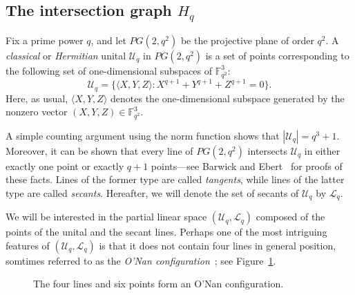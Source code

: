 \documentclass[A4paper,reqno,oneside,12pt]{amsart}
\theoremstyle{plain}
\theoremstyle{definition}
\newcommand{\scL}{\mathscr{L}}
\newcommand{\scU}{\mathscr{U}}
\newcommand{\F}{\mathbb{F}}
\begin{document}
\subsection{The intersection graph $H_q$}
Fix a prime power $q$, and let $PG(2,q^2)$ be the projective plane of order $q^2$.
A {\it classical} or {\it Hermitian} unital $\scU_q$ in $PG(2,q^2)$ is a set of points corresponding to the following set of one-dimensional subspaces of $\F_{q^2}^3$:
\begin{equation*}
    \scU_q = \{ \langle X, Y, Z \rangle: X^{q+1} + Y^{q+1} + Z^{q+1} = 0 \}.
\end{equation*}
Here, as usual, $\langle X, Y, Z \rangle$ denotes the one-dimensional subspace generated by the nonzero vector $(X,Y,Z) \in \F_{q^2}^3$.

A simple counting argument using the norm function shows that $|\scU_q| = q^3+1$.
Moreover, it can be shown that every line of $PG(2,q^2)$ intersects $\scU_q$ in either exactly one point or exactly $q+1$ points---see
Barwick and Ebert~\cite[\S 2.1]{BE} 
for proofs of these facts.
Lines of the former type are called {\it tangents}, while lines of the latter type are called {\it secants}.
Hereafter, we will denote the set of secants of $\scU_q$ by $\scL_q$.

We will be interested in the partial linear space $(\scU_q, \scL_q)$ composed of the points of the unital and the secant lines.
Perhaps one of the most intriguing features of $(\scU_q, \scL_q)$ is that it does not contain four lines in general position, somtimes referred to as the {\it O'Nan configuration}~\cite{O72}; 
see Figure~\ref{fig: o'nan}.

\begin{figure}
    \centering
    \caption{The four lines and six points form an O'Nan configuration.}
    \label{fig: o'nan}
\end{figure}
\end{document}
